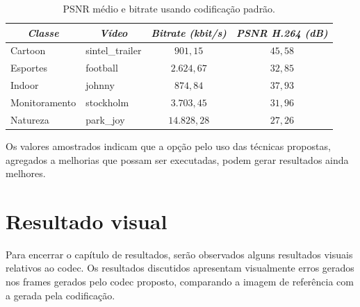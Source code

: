 \documentclass[cic,tc]{iiufrgs}
\begin{document}
\begin{table}[h]
    \caption{PSNR médio e bitrate usando codificação padrão.}
    \centering
        \begin{tabular}{|l|l|c|c|}
          \hline
          \multicolumn{1}{|c}{\textit{Classe}} & 
          \multicolumn{1}{|c}{\textit{Vídeo}} & 
          \multicolumn{1}{|c|}{\textit{Bitrate (kbit/s)}} &
          \multicolumn{1}{|c|}{\textit{PSNR H.264 (dB)}} \\
          \hline
          \hline
          Cartoon & sintel\_trailer & $901,15$ & $45,58$ \\
          Esportes & football & $2.624,67$ & $32,85$ \\
          Indoor & johnny & $874,84$ & $37,93$ \\
          Monitoramento & stockholm & $3.703,45$ & $31,96$ \\
          Natureza & park\_joy & $14.828,28$ & $27,26$ \\
          \hline
        \end{tabular}
    \label{tbl:bitrateonlyh264}
\end{table}

Os valores amostrados indicam que a opção pelo uso das técnicas propostas,
agregados a melhorias que possam ser executadas, podem gerar resultados ainda melhores.

\section{Resultado visual}
\label{sec:resultadovisual}
Para encerrar o capítulo de resultados, serão observados alguns resultados visuais relativos 
ao codec.
Os resultados discutidos apresentam visualmente erros gerados nos frames gerados 
pelo codec proposto,
comparando a imagem de referência com a gerada pela codificação.
\end{document}
